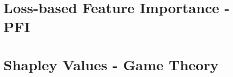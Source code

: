 \documentclass[11pt,compress,t,notes=noshow, aspectratio=169, xcolor=table]{beamer}
\begin{document}
% 
% 
% 

% 


% 

\section{Loss-based Feature Importance - PFI}



% 
% 
% 
% 
\section{Shapley Values - Game Theory}

% 
% 
% 
% 
% 
% 
\end{document}
